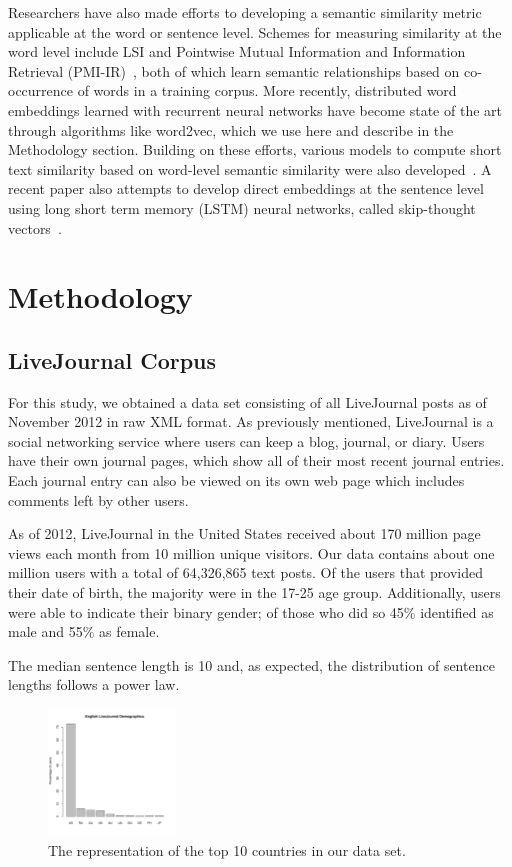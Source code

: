 \documentclass{sigchi}
\begin{document}
Researchers have also made efforts to developing a semantic similarity metric applicable at the word or sentence level. Schemes for measuring similarity at the word level include LSI and Pointwise Mutual Information and Information Retrieval (PMI-IR)~\cite{turney2001}, both of which learn semantic relationships based on co-occurrence of words in a training corpus. More recently, distributed word embeddings learned with recurrent neural networks have become state of the art through algorithms like word2vec, which we use here and describe in the Methodology section. Building on these efforts, various models to compute short text similarity  based on  word-level semantic similarity were also developed~\cite{mihalcea2006,kenter15short}. A recent paper also attempts to develop direct embeddings at the sentence level using long short term memory (LSTM) neural networks, called skip-thought vectors~\cite{kiros2015skip}. 

\section{Methodology}

\subsection{LiveJournal Corpus}
For this study, we obtained a data set consisting of all LiveJournal posts as of November 2012 in raw XML format. As previously mentioned, LiveJournal is a social networking service where users can keep a blog, journal, or diary. Users have their own journal pages, which show all of their most recent journal entries. Each journal entry can also be viewed on its own web page which includes comments left by other users. 

As of 2012, LiveJournal in the United States received about 170 million page views each month from 10 million unique visitors. Our data contains about one million users with a total of 64,326,865 text posts. Of the users that provided their date of birth, the majority were in the 17-25 age group. Additionally, users were able to indicate their binary gender; of those who did so 45\% identified as male and 55\% as female. 

The median sentence length is 10 and, as expected, the distribution of sentence lengths follows a power law.

\begin{figure}[tb]
\centering \includegraphics[width=0.3\textwidth]{figures/demographics} 
\caption{The representation of the top 10 countries in our data set.  \label{fig:demographics}}
\end{figure}
\end{document}
